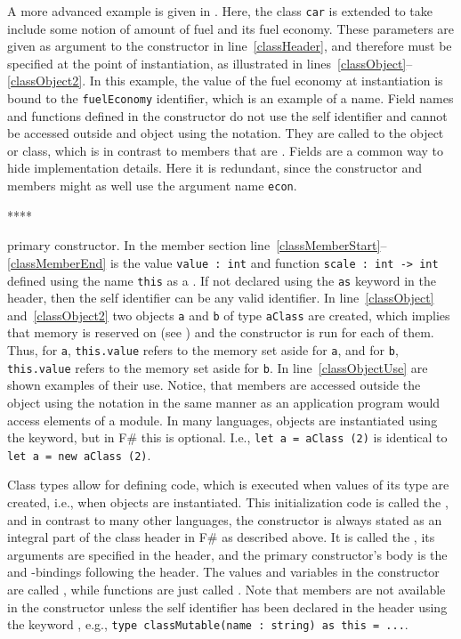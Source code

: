 A more advanced example is given in .
%
%
%
Here, the class \lstinline{car} is extended to take include some notion of amount of fuel and its fuel economy. These parameters are given as argument to the constructor in line~\ref{classHeader}, and therefore must be specified at the point of instantiation, as illustrated in lines~\ref{classObject}--\ref{classObject2}. In this example, the value of the fuel economy at instantiation is bound to the \lstinline{fuelEconomy} identifier, which is an example of a  name. Field names and functions defined in the constructor do not use the self identifier and cannot be accessed outside and object using the  notation. They are called  to the object or class, which is in contrast to members that are . Fields are a common way to hide implementation details. Here it is redundant, since the constructor and members might as well use the argument name \lstinline{econ}.

****

primary constructor. In the member section line~\ref{classMemberStart}--\ref{classMemberEnd} is the value \lstinline{value : int} and function \lstinline{scale : int -> int} defined using the name \lstinline{this} as a . If not declared using the \lstinline{as} keyword in the header, then the self identifier can be any valid identifier. In line~\ref{classObject} and~\ref{classObject2} two objects \lstinline{a} and \lstinline{b} of type \lstinline{aClass} are created, which implies that memory is reserved on  (see ) and the constructor is run for each of them. Thus, for \lstinline{a}, \lstinline{this.value} refers to the memory set aside for \lstinline{a}, and for \lstinline{b}, \lstinline{this.value} refers to the memory set aside for \lstinline{b}. In line~\ref{classObjectUse} are shown examples of their use. Notice, that members are accessed outside the object using the  notation in the same manner as an application program would access elements of a module. In many languages, objects are instantiated using the  keyword, but in F\# this is optional. I.e., \lstinline{let a = aClass (2)} is identical to \lstinline{let a = new aClass (2)}.

Class types allow for defining code, which is executed when values of its type are created, i.e., when objects are instantiated. This initialization code is called the , and in contrast to many other languages, the constructor is always stated as an integral part of the class header in F\# as described above. It is called the , its arguments are specified in the header, and the primary constructor's body is the  and -bindings following the header. The values and variables in the constructor are called , while functions are just called . Note that members are not available in the constructor unless the self identifier has been declared in the header using the keyword , e.g., \lstinline{type classMutable(name : string) as this = ...}.


